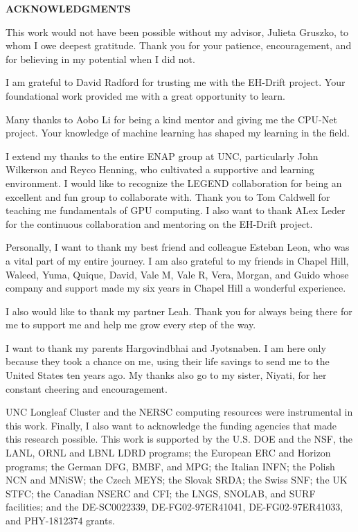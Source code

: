 \begin{center}
\vspace*{52pt}
{\normalfont \textbf{ACKNOWLEDGMENTS}}
\end{center}

This work would not have been possible without my advisor, Julieta Gruszko, to whom I owe deepest gratitude. Thank you for your patience, encouragement, and for believing in my potential when I did not.

I am grateful to David Radford for trusting me with the EH-Drift project. Your foundational work provided me with a great opportunity to learn. 

Many thanks to Aobo Li for being a kind mentor and giving me the CPU-Net project. Your knowledge of machine learning has shaped my learning in the field.

I extend my thanks to the entire ENAP group at UNC, particularly John Wilkerson and Reyco Henning, who cultivated a supportive and learning environment. I would like to recognize the LEGEND collaboration for being an excellent and fun group to collaborate with. Thank you to Tom Caldwell for teaching me fundamentals of GPU computing. I also want to thank ALex Leder for the continuous collaboration and mentoring on the EH-Drift project.

Personally, I want to thank my best friend and colleague Esteban Leon, who was a vital part of my entire journey. I am also grateful to my friends in Chapel Hill, Waleed, Yuma, Quique, David, Vale M, Vale R, Vera, Morgan, and Guido whose company and support made my six years in Chapel Hill a wonderful experience.

I also would like to thank my partner Leah. Thank you for always being there for me to support me and help me grow every step of the way.

I want to thank my parents Hargovindbhai and Jyotsnaben. I am here only because they took a chance on me, using their life savings to send me to the United States ten years ago. My thanks also go to my sister, Niyati, for her constant cheering and encouragement.

UNC Longleaf Cluster and the NERSC computing resources were instrumental in this work. Finally, I also want to acknowledge the funding agencies that made this research possible. This work is supported by the U.S. DOE and the NSF, the LANL, ORNL and LBNL LDRD programs; the European ERC and Horizon programs; the German DFG, BMBF, and MPG; the Italian INFN; the Polish NCN and MNiSW; the Czech MEYS; the Slovak SRDA; the Swiss SNF; the UK STFC; the Canadian NSERC and CFI; the LNGS, SNOLAB, and SURF facilities; and the DE-SC0022339, DE-FG02-97ER41041, DE-FG02-97ER41033, and PHY-1812374 grants.

\clearpage